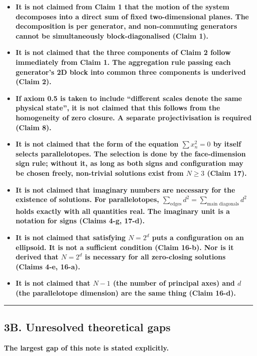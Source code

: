 \documentclass[
  10pt,
]{article}
\begin{document}
\begin{itemize}
\item
  \textbf{It is not claimed from Claim 1 that the motion of the system
  decomposes into a direct sum of fixed two-dimensional planes. The
  decomposition is per generator, and non-commuting generators cannot be
  simultaneously block-diagonalised (Claim 1).}
\item
  \textbf{It is not claimed that the three components of Claim 2 follow
  immediately from Claim 1. The aggregation rule passing each
  generator's 2D block into common three components is underived (Claim
  2).}
\item
  \textbf{If axiom 0.5 is taken to include ``different scales denote the
  same physical state'', it is not claimed that this follows from the
  homogeneity of zero closure. A separate projectivisation is required
  (Claim 8).}
\item
  \textbf{It is not claimed that the form of the equation
  \(\sum x_n^2 = 0\) by itself selects parallelotopes. The selection is
  done by the face-dimension sign rule; without it, as long as both
  signs and configuration may be chosen freely, non-trivial solutions
  exist from \(N\ge3\) (Claim 17).}
\item
  \textbf{It is not claimed that imaginary numbers are necessary for the
  existence of solutions. For parallelotopes,
  \(\sum_{\text{edges}}d^2 = \sum_{\text{main diagonals}}d^2\) holds
  exactly with all quantities real. The imaginary unit is a notation for
  signs (Claims 4-g, 17-d).}
\item
  \textbf{It is not claimed that satisfying \(N=2^d\) puts a
  configuration on an ellipsoid. It is not a sufficient condition (Claim
  16-b). Nor is it derived that \(N=2^d\) is necessary for all
  zero-closing solutions (Claims 4-e, 16-a).}
\item
  \textbf{It is not claimed that \(N-1\) (the number of principal axes)
  and \(d\) (the parallelotope dimension) are the same thing (Claim
  16-d).}
\end{itemize}

\begin{center}\rule{0.5\linewidth}{0.5pt}\end{center}

\subsection{3B. Unresolved theoretical
gaps}\label{b.-unresolved-theoretical-gaps}

\textbf{The largest gap of this note is stated explicitly.}
\end{document}
